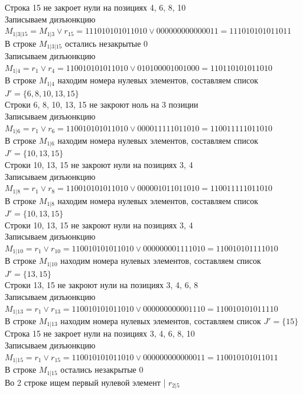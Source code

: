 \documentclass[12pt,a4paper]{report}
\begin{document}
Строка 15 не закроет нули на позициях 4, 6, 8, 10 \\
Записываем дизъюнкцию $M_{1 | 3 | 15} = M_{1 | 3}\vee r_{15} = 111010101011010 \vee 000000000000011 = 111010101011011$ \\
В строке $M_{1 | 3 | 15}$ остались незакрытые $0$ \\
Записываем дизъюнкцию $M_{1 | 4} = r_{1}\vee r_{4} = 110010101011010 \vee 010100001001000 = 110110101011010$ \\
В строке $M_{1 | 4}$ находим номера нулевых элементов, составляем список $J' = \{6, 8, 10, 13, 15\}$ \\
Строки 6, 8, 10, 13, 15 не закроют ноль на 3 позиции \\
Записываем дизъюнкцию $M_{1 | 6} = r_{1}\vee r_{6} = 110010101011010 \vee 000011111011010 = 110011111011010$ \\
В строке $M_{1 | 6}$ находим номера нулевых элементов, составляем список $J' = \{10, 13, 15\}$ \\
Строки 10, 13, 15 не закроют нули на позициях 3, 4 \\
Записываем дизъюнкцию $M_{1 | 8} = r_{1}\vee r_{8} = 110010101011010 \vee 000001011011010 = 110011111011010$ \\
В строке $M_{1 | 8}$ находим номера нулевых элементов, составляем список $J' = \{10, 13, 15\}$ \\
Строки 10, 13, 15 не закроют нули на позициях 3, 4 \\
Записываем дизъюнкцию $M_{1 | 10} = r_{1}\vee r_{10} = 110010101011010 \vee 000000001111010 = 110010101111010$ \\
В строке $M_{1 | 10}$ находим номера нулевых элементов, составляем список $J' = \{13, 15\}$ \\
Строки 13, 15 не закроют нули на позициях 3, 4, 6, 8 \\
Записываем дизъюнкцию $M_{1 | 13} = r_{1}\vee r_{13} = 110010101011010 \vee 000000000001110 = 110010101011110$ \\
В строке $M_{1 | 13}$ находим номера нулевых элементов, составляем список $J' = \{15\}$ \\
Строка 15 не закроет нули на позициях 3, 4, 6, 8, 10 \\
Записываем дизъюнкцию $M_{1 | 15} = r_{1}\vee r_{15} = 110010101011010 \vee 000000000000011 = 110010101011011$ \\
В строке $M_{1 | 15}$ остались незакрытые $0$ \\
Во 2 строке ищем первый нулевой элемент | $r_{2 | 5}$ \\
\end{document}
